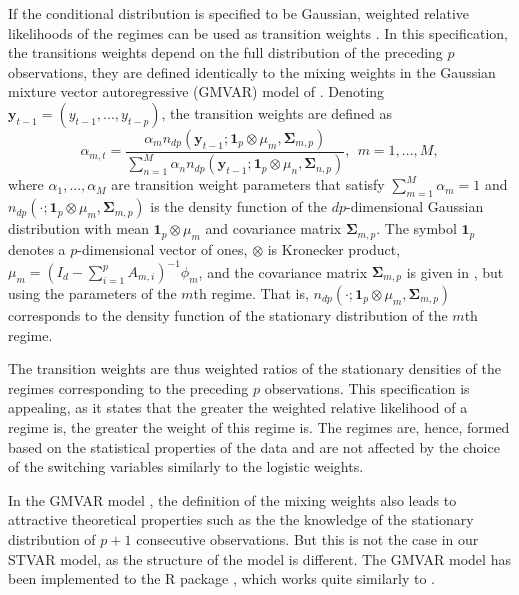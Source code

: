 \documentclass[nojss]{jss}
\begin{document}
If the conditional distribution is specified to be Gaussian, weighted relative likelihoods of the regimes can be used as transition weights \citep{Lanne+Virolainen:2024}. In this specification, the transitions weights depend on the full distribution of the preceding $p$ observations, they are defined identically to the mixing weights in the Gaussian mixture vector autoregressive (GMVAR) model of \cite{Kalliovirta+Meitz+Saikkonen:2016}.
Denoting $\boldsymbol{y}_{t-1}=(y_{t-1},...,y_{t-p})$, the transition weights are defined as
\begin{equation}\label{eq:alpha_mt}
\alpha_{m,t} = \frac{\alpha_m n_{dp}(\boldsymbol{y}_{t-1};\boldsymbol{1}_p\otimes \mu_m, \boldsymbol{\Sigma}_{m,p})}{\sum_{n=1}^M \alpha_n n_{dp}(\boldsymbol{y}_{t-1};\boldsymbol{1}_p\otimes \mu_n, \boldsymbol{\Sigma}_{n,p})}, \ \ m=1,...,M,
\end{equation}
where $\alpha_1,...,\alpha_M$ are transition weight parameters that satisfy $\sum_{m=1}^M \alpha_m=1$ and $n_{dp}(\cdot;\boldsymbol{1}_p\otimes \mu_m, \boldsymbol{\Sigma}_{m,p})$ is the density function of the $dp$-dimensional Gaussian distribution with mean $\boldsymbol{1}_p\otimes \mu_m$ and covariance matrix $\boldsymbol{\Sigma}_{m,p}$. The symbol $\boldsymbol{1}_p$ denotes a $p$-dimensional vector of ones, $\otimes$ is Kronecker product, $\mu_m=(I_d - \sum_{i=1}^pA_{m,i})^{-1}\phi_m$, and the covariance matrix $\boldsymbol{\Sigma}_{m,p}$ is given in \citet[Equation~(2.1.39)]{Lutkepohl:2005}, but using the parameters of the $m$th regime. That is, $n_{dp}(\cdot;\boldsymbol{1}_p\otimes \mu_m, \boldsymbol{\Sigma}_{m,p})$ corresponds to the density function of the stationary distribution of the $m$th regime.

The transition weights are thus weighted ratios of the stationary densities of the regimes corresponding to the preceding $p$ observations. This specification is appealing, as it states that the greater the weighted relative likelihood of a regime is, the greater the weight of this regime is. The regimes are, hence, formed based on the statistical properties of the data and are not affected by the choice of the switching variables similarly to the logistic weights.

In the GMVAR model \citep{Kalliovirta+Meitz+Saikkonen:2016}, the definition of the mixing weights also leads to attractive theoretical properties such as the the knowledge of the stationary distribution of $p+1$ consecutive observations. But this is not the case in our STVAR model, as the structure of the model is different. The GMVAR model has been implemented to the R package  \citep{gmvarkit}, which works quite similarly to .
\end{document}
